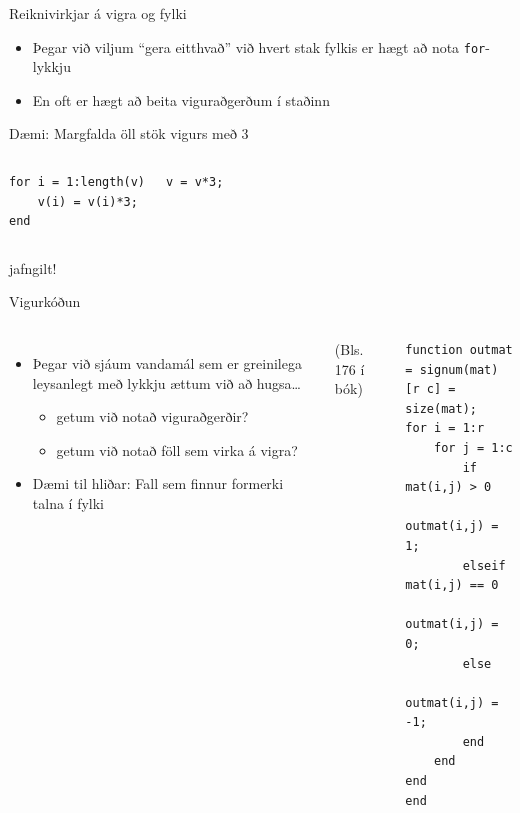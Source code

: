 \documentclass{beamer}
\begin{document}
\begin{frame}[fragile]{Reiknivirkjar á vigra og fylki}
\vspace{\baselineskip}
\begin{itemize}
 \item Þegar við viljum ``gera eitthvað'' við hvert stak fylkis er hægt að nota \texttt{for}-lykkju
 \item En oft er hægt að beita viguraðgerðum í staðinn
\end{itemize}
Dæmi: Margfalda öll stök vigurs með 3
\begin{columns}
\begin{verbatim}
for i = 1:length(v)
    v(i) = v(i)*3;
end
\end{verbatim}
\begin{verbatim}
v = v*3;
\end{verbatim}
\end{columns}
\begin{center}
 jafngilt!
\end{center}
\end{frame}

\begin{frame}[fragile]{Vigurkóðun}
\begin{columns}
\begin{itemize}
 \item Þegar við sjáum vandamál sem er greinilega leysanlegt með lykkju ættum við að hugsa\ldots
 \begin{itemize}
  \item getum við notað viguraðgerðir?
  \item getum við notað föll sem virka á vigra?
 \end{itemize}
 \item Dæmi til hliðar: Fall sem finnur formerki talna í fylki
\end{itemize}
(Bls. 176 í bók)
\begin{verbatim}
function outmat = signum(mat)
[r c] = size(mat);
for i = 1:r
    for j = 1:c
        if mat(i,j) > 0
            outmat(i,j) = 1;
        elseif mat(i,j) == 0
            outmat(i,j) = 0;
        else
            outmat(i,j) = -1;
        end
    end
end
end
\end{verbatim}
\end{columns}
\end{frame}
\end{document}
